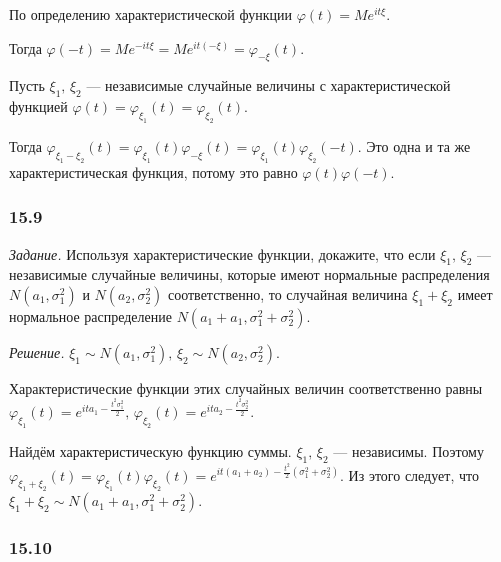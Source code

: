 По определению характеристической функции $ \varphi \left( t \right) = Me^{it \xi }$.

Тогда $ \varphi \left( - t \right) = Me^{- it \xi } = Me^{it \left( - \xi \right) } = \varphi_{- \xi } \left( t \right) $.

Пусть $ \xi_1, \, \xi_2$ ---
независимые случайные величины с характеристической функцией $ \varphi \left( t \right) = \varphi_{ \xi_1} \left( t \right) = \varphi_{ \xi_2} \left( t \right) $.

Тогда
$ \varphi_{ \xi_1 - \xi_2} \left( t \right) =
\varphi_{ \xi_1} \left( t \right) \varphi_{- \xi} \left( t \right) =
\varphi_{ \xi_1} \left( t \right) \varphi_{ \xi_2} \left( - t \right) $.
Это одна и та же характеристическая функция, потому это равно $ \varphi \left( t \right) \varphi \left( - t \right) $.

\subsubsection*{15.9}

\textit{Задание.}
Используя характеристические функции, докажите, что если $ \xi_1, \, \xi_2$ --- независимые случайные величины,
которые имеют нормальные распределения $N \left( a_1, \sigma_1^2 \right) $ и $N \left( a_2, \sigma_2^2 \right) $ соответственно,
то случайная величина $ \xi_1 + \xi_2$ имеет нормальное распределение $N \left( a_1 + a_1, \sigma_1^2 + \sigma_2^2 \right) $.

\textit{Решение.} $ \xi_1 \sim N \left( a_1, \sigma_1^2 \right), \, \xi_2 \sim N \left( a_2, \sigma_2^2 \right) $.

Характеристические функции этих случайных величин соответственно равны
$ \varphi_{ \xi_1} \left( t \right) = e^{ita_1 - \frac{t^2 \sigma_1^2}{2}}, \,
\varphi_{ \xi_2} \left( t \right) = e^{ita_2 - \frac{t^2 \sigma_2^2}{2}}$.

Найдём характеристическую функцию суммы.
$ \xi_1, \, \xi_2$ --- независимы.
Поэтому
$ \varphi_{ \xi_1 + \xi_2} \left( t \right) =
\varphi_{ \xi_1} \left( t \right) \varphi_{ \xi_2} \left( t \right) =
e^{it \left( a_1 + a_2 \right) - \frac{t^2}{2} \left( \sigma_1^2 + \sigma_2^2 \right) }$.
Из этого следует, что $ \xi_1 + \xi_2 \sim N \left( a_1 + a_1, \sigma_1^2 + \sigma_2^2 \right) $.

\subsubsection*{15.10}

